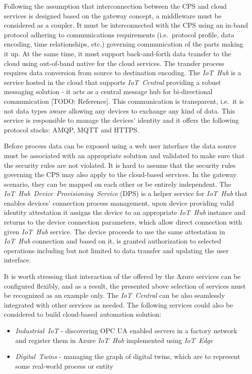 \documentclass{jacsart}
\begin{document}
Following the assumption that interconnection between the CPS and cloud services is designed based on the gateway concept, a middleware must be considered as a coupler. It must be interconnected with the CPS using an in-band protocol adhering to communications requirements (i.e.~protocol profile, data encoding, time relationships, etc.) governing communication of the parts making it up. At the same time, it must support back-and-forth data transfer to the cloud using out-of-band native for the cloud services. The transfer process requires data conversion from source to destination encoding. The \textit{IoT\ Hub} is a service hosted in the cloud that supports \textit{IoT\ Central} providing a robust messaging solution - it acts as a central message hub for bi-directional communication [TODO: Reference]. This communication is transparent, i.e.~it is not data types aware allowing
any devices to exchange any kind of data. This service is responsible to manage the devices' identity and it offers the following protocol stacks: AMQP, MQTT and HTTPS.

Before process data can be exposed using a web user interface the data source must be associated with an appropriate solution and validated to make sure that the security rules are not violated. It is hard to assume that the security rules governing the CPS may also apply to the cloud-based services. In the gateway scenario, they can be mapped on each other or be entirely independent. The \textit{IoT\ Hub\ Device\ Provisioning\ Service} (DPS) is a helper service for \textit{IoT\ Hub} that enables devices' connection process management, upon device providing valid identity attestation it assigns the device to an appropriate \textit{IoT\ Hub} instance and returns to the device connection parameters, which allow direct connection with given \textit{IoT\ Hub} service. The device proceeds to use the same attestation in \textit{IoT\ Hub} connection and based on it, is granted authorization to selected operations including but not limited to data transfer and updating the user interface.

It is worth stressing that interaction of the offered by the Azure
services can be configured flexibly, and as a result, the presented
above selection of services must be recognized as an example only. The
\textit{IoT\ Central} can be also seamlessly integrated with other
services as needed. The following services could also be considered to
build cloud-based automation solution:

\begin{itemize}
      \item \textit{Industrial\ IoT} - discovering OPC UA enabled servers in a factory network and register them in Azure \textit{IoT\ Hub} implemented using \textit{IoT\ Edge}
      \item \textit{Digital\ Twins} - managing the graph of digital twins, which are to represent some real-world process or entity
\end{itemize}
\end{document}

